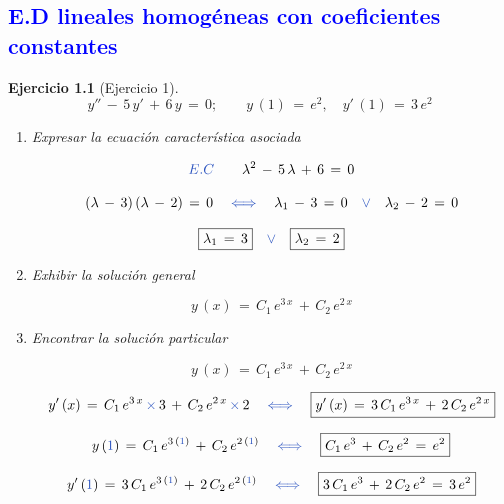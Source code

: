 \documentclass[a4paper,11pt, openany]{book}
\newtheorem{ejer}{Ejercicio}[section]
\newcommand*{\itembolasazules}[1]{%
\footnotesize\protect\tikz[baseline=-3pt]%
\protect\node[scale=.7, circle, shade, ball
color=green]{\color{white}\Large\bf#1};}
\begin{document}
\tableofcontents
 
\textcolor{blue}{\chapter{E.D lineales homogéneas con coeficientes constantes }} 
 
\begin{ejer}[Ejercicio 1]
 
$$y''\,-\,5\,y'\,+\,6\,y\,=\,0; \qquad y\,(1)\,=\,e^{2}, \quad y'\,(1)\,=\,3\,e^{2}$$
 
\begin{enumerate}[label=\itembolasazules{\arabic*}]
 
\item Expresar la ecuación característica asociada
 
 
$$\textcolor{ceruleanblue}{E.C} \qquad \lambda^{2}\,-\,5\,\lambda\,+\,6\,=\,0$$
 
$$(\lambda\,-\,3)\,(\lambda\,-\,2)\,=\,0 \quad \textcolor{ceruleanblue}{\iff} \quad \lambda_{1}\,-\,3\,=\,0 \quad \textcolor{ceruleanblue}{\vee} \quad \lambda_{2}\,-\,2\,=\,0$$
 
$$\boxed{\lambda_{1}\,=\,3} \quad \textcolor{ceruleanblue}{\vee} \quad \boxed{\lambda_{2}\,=\,2} $$
 
\item Exhibir la solución general
 
$$\boxed{y\,(x)\,=\,C_{1}\,e^{3\,x}\,+\,C_{2}\,e^{2\,x} }$$
 
\item Encontrar la solución particular
 
$$y\,(x)\,=\,C_{1}\,e^{3\,x}\,+\,C_{2}\,e^{2\,x}$$
 
$$y'\,(x)\,=\,C_{1}\,e^{3\,x}\,\textcolor{ceruleanblue}{\times}\,3\,+\,C_{2}\,e^{2\,x}\,\textcolor{ceruleanblue}{\times}\,2 \quad \textcolor{ceruleanblue}{\iff} \quad \boxed{y'\,(x)\,=\,3\,C_{1}\,e^{3\,x}\,+\,2\,C_{2}\,e^{2\,x} }$$
 
$$y\,(\textcolor{ceruleanblue}{1})\,=\,C_{1}\,e^{3\,(\textcolor{ceruleanblue}{1})}\,+\,C_{2}\,e^{2\,(\textcolor{ceruleanblue}{1})} \quad \textcolor{ceruleanblue}{\iff} \quad \boxed{C_{1}\,e^{3}\,+\,C_{2}\,e^{2}\,=\,e^{2}}$$
 
$$y'\,(\textcolor{ceruleanblue}{1})\,=\,3\,C_{1}\,e^{3\,(\textcolor{ceruleanblue}{1})}\,+\,2\,C_{2}\,e^{2\,(\textcolor{ceruleanblue}{1})} \quad \textcolor{ceruleanblue}{\iff} \quad \boxed{3\,C_{1}\,e^{3}\,+\,2\,C_{2}\,e^{2}\,=\,3\,e^{2}}$$
 

\end{enumerate}
\end{ejer}
\end{document}

